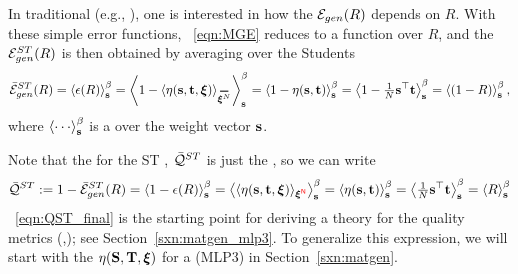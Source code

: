 

In traditional \STATMECH (e.g., \cite{SST92}), one is interested in how the \emph{\TotalModelGeneralizationError} ${\mathcal{E}}_{gen}(R)$ depends on $R$.
With these simple error functions, \EQN~\ref{eqn:MGE} reduces to a function over $R$,
and the \AverageSTGeneralizationError ${\mathcal{E}}^{ST}_{gen}(R)$ is then obtained by averaging over the Students 
\begin{align}
\label{eqn:AVGSTGE_R}
\AVGSTGE(R)=\THRMAVG{\EPSL(R)}=
\THRMAVG{1-\langle\ETA(\SVEC,\TVEC,\XI)\rangle_{\AVGNDXI}}=
\THRMAVG{1-\ETA(\SVEC,\TVEC)}=
\THRMAVG{1-\tfrac{1}{N}\SVEC^{\top}\TVEC}=
\THRMAVG{(1-R)}  ,
\end{align}
where $\THRMAVG{\cdots}$ is a \ThermalAverage over the \Student weight vector ${\mathbf{s}}$.

Note that the \ModelQuality for the ST \Perceptron, $\bar{\mathcal{Q}}^{ST}$
is just the \AverageGeneralizationAccuracy, so we can write
\begin{align}
\label{eqn:QST_final}
\bar{\mathcal{Q}}^{ST}:=1-\bar{\mathcal{E}}^{ST}_{gen}(R)=\left\langle 1-\epsilon(R) \right\rangle_{\mathbf s}^{\beta}
=\left\langle \langle\eta({\mathbf{s}}, {\mathbf{t}}, \boldsymbol{\xi}) \rangle_{\boldsymbol{\xi}^{{\color{red}\sf{N}}}} \right\rangle_{\mathbf s}^{\beta}
=\left\langle \eta({\mathbf{s}}, {\mathbf{t}}) \right\rangle_{\mathbf s}^{\beta}
=\left\langle \tfrac{1}{N}{\mathbf{s}}^{\top}{\mathbf{t}} \right\rangle_{\mathbf s}^{\beta}=\left\langle R \right\rangle_{\mathbf s}^{\beta}
\end{align}
\EQN~\ref{eqn:QST_final} is the starting point for deriving a \SEMIEMP theory for the \WW quality metrics (\ALPHA,\ALPHAHAT);
see Section~\ref{sxn:matgen_mlp3}.
To generalize this expression, we will start with the \SelfOverlap $\eta({\mathbf{S}},{\mathbf{T}},\boldsymbol{\xi})$ for a
\MultiLayerPerceptron (MLP3) in Section~\ref{sxn:matgen}.

